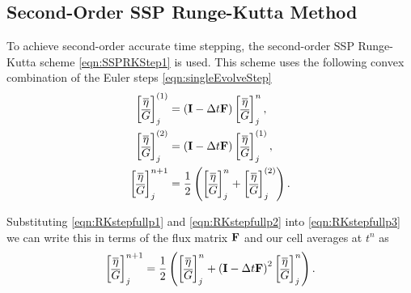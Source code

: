 \subsection{Second-Order SSP Runge-Kutta Method}
\label{subsec:RKstepdisp}
To achieve second-order accurate time stepping, the second-order SSP Runge-Kutta scheme \eqref{eqn:SSPRKStep1} is used. This scheme uses the following convex combination of the Euler steps \eqref{eqn:singleEvolveStep} 
\begin{subequations}
	\label{eqn:RKstepfull}
	\begin{align}
	\label{eqn:RKstepfullp1}
	\begin{bmatrix}
	\overline{\eta} \\ \overline{G}
	\end{bmatrix}_j^{(1)} &= \left(\mathbf{I} - \Delta t\mathbf{F} \right)\begin{bmatrix}
	\overline{\eta} \\ \overline{G}
	\end{bmatrix}^{n}_j, \\
	\label{eqn:RKstepfullp2}
	\begin{bmatrix}
	\overline{\eta} \\ \overline{G}
	\end{bmatrix}_j^{(2)} &= \left(\mathbf{I} - \Delta t\mathbf{F} \right)\begin{bmatrix}
	\overline{\eta} \\ \overline{G}
	\end{bmatrix}_j^{(1)}, \\
	\label{eqn:RKstepfullp3}
	\begin{bmatrix}
	\overline{\eta} \\ \overline{G}
	\end{bmatrix}^{n+1}_j &= \frac{1}{2} \left(\begin{bmatrix}
	\overline{\eta} \\ \overline{G}
	\end{bmatrix}^{n}_j + \begin{bmatrix}
	\overline{\eta} \\ \overline{G}
	\end{bmatrix}_j^{(2)}\right).
	\end{align}
\end{subequations}

Substituting \eqref{eqn:RKstepfullp1} and \eqref{eqn:RKstepfullp2} into \eqref{eqn:RKstepfullp3} we can write this in terms of the flux matrix $\mathbf{F}$ and our cell averages at $t^n$ as
\begin{equation*}
\begin{bmatrix}
\overline{\eta} \\ \overline{G}
\end{bmatrix}^{n+1}_j = \frac{1}{2} \left(\begin{bmatrix}
\overline{\eta} \\ \overline{G}
\end{bmatrix}^{n}_j + \left(\mathbf{I} - \Delta t\mathbf{F} \right)^2 \begin{bmatrix}
\overline{\eta} \\ \overline{G}
\end{bmatrix}^{n}_j\right).
\end{equation*}

